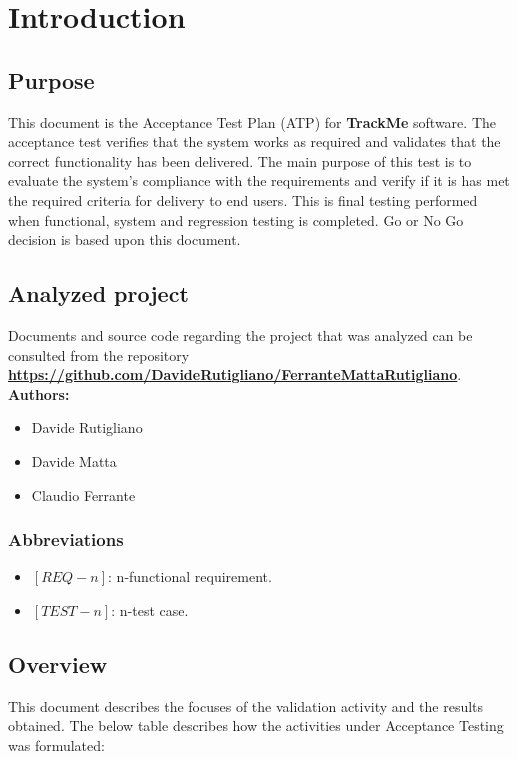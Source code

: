 \documentclass[a4paper, hidelinks, 12pt]{report}
\begin{document}
	\chapter{Introduction}
	\section{Purpose}
	This document is the Acceptance Test Plan (ATP) for \textbf{TrackMe} software. The acceptance test verifies that the system works as required and validates that the correct functionality has been delivered.  The main purpose of this test is to evaluate the system's compliance with the requirements and verify if it is has met the required criteria for delivery to end users. This is final testing performed when functional, system and regression testing is completed. Go or No Go decision is based upon this document.
	
	\section{Analyzed project}
	Documents and source code regarding the project that was analyzed can be consulted from the repository 
		\href{https://github.com/DavideRutigliano/FerranteMattaRutigliano}{\textbf{https://github.com/DavideRutigliano/FerranteMattaRutigliano}}.\\
		
	\textbf{Authors: } 
	\begin{itemize}
		\item Davide Rutigliano
		\item Davide Matta
		\item Claudio Ferrante
	\end{itemize}
	
	\subsection{Abbreviations}
	\begin{itemize}
		\item $[REQ-n]$: n-functional requirement.
		\item $[TEST-n]$: n-test case.
	\end{itemize}

\section{Overview}
This document describes the focuses of the validation activity and the results obtained. The below table describes how the activities under Acceptance Testing was formulated:
\end{document}
